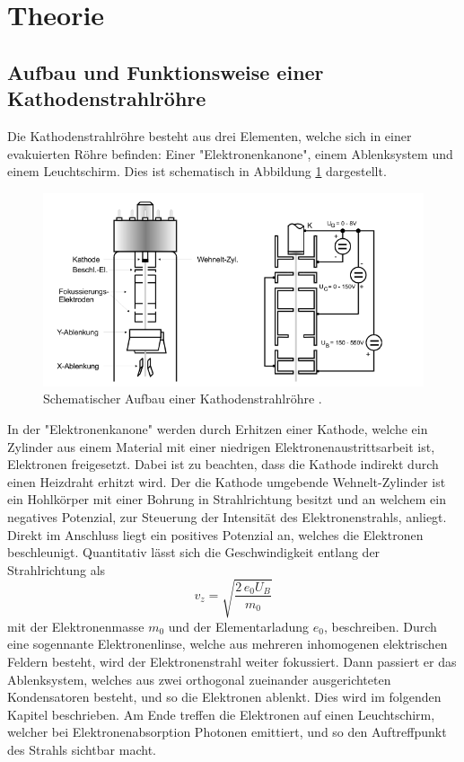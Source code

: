 \section{Theorie}
\label{sec:Theorie}

\subsection{Aufbau und Funktionsweise einer Kathodenstrahlröhre}
\label{sec:kröhre}
Die Kathodenstrahlröhre besteht aus drei Elementen, welche sich in einer evakuierten Röhre befinden: Einer "Elektronenkanone", einem Ablenksystem und einem Leuchtschirm.
Dies ist schematisch in Abbildung \ref{fig:kröhre} dargestellt.
\begin{figure}
  \centering
  \includegraphics{images/kroehre.png}
  \caption{Schematischer Aufbau einer Kathodenstrahlröhre \cite{501}.}
  \label{fig:kröhre}
\end{figure}
In der "Elektronenkanone" werden durch Erhitzen einer Kathode, welche ein Zylinder aus einem Material mit einer niedrigen Elektronenaustrittsarbeit ist, Elektronen
freigesetzt. Dabei ist zu beachten, dass die Kathode indirekt durch einen Heizdraht erhitzt wird. Der die Kathode umgebende Wehnelt-Zylinder ist ein Hohlkörper mit
einer Bohrung in Strahlrichtung besitzt und an welchem ein negatives Potenzial, zur Steuerung der Intensität des Elektronenstrahls, anliegt.
Direkt im Anschluss liegt ein positives Potenzial an, welches die Elektronen beschleunigt. Quantitativ lässt sich die Geschwindigkeit entlang der Strahlrichtung als
\begin{equation}
  v_z = \sqrt{\frac{2 \, e_0 U_B}{m_0}}
  \label{eqn:vz}
\end{equation}
mit der Elektronenmasse $m_0$ und der Elementarladung $e_0$, beschreiben.
Durch eine sogennante Elektronenlinse, welche aus mehreren inhomogenen elektrischen Feldern besteht, wird der Elektronenstrahl weiter fokussiert.
Dann passiert er das Ablenksystem, welches aus zwei orthogonal zueinander ausgerichteten Kondensatoren besteht, und so die Elektronen ablenkt. Dies wird
im folgenden Kapitel beschrieben. Am Ende treffen die Elektronen auf einen Leuchtschirm, welcher bei Elektronenabsorption Photonen emittiert, und so den
Auftreffpunkt des Strahls sichtbar macht.

